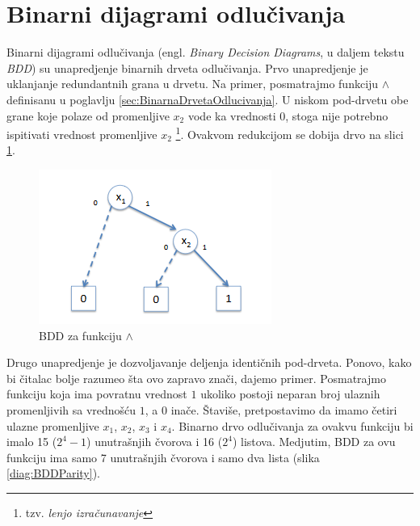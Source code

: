 \section{Binarni dijagrami odlu\v{c}ivanja}
\label{sec:BDD}

Binarni dijagrami odlu\v{c}ivanja (engl. \emph{Binary Decision Diagrams}, u daljem tekstu \emph{BDD}) su unapredjenje binarnih drveta odlu\v{c}ivanja. Prvo unapredjenje je uklanjanje redundantnih grana u drvetu. Na primer, posmatrajmo funkciju $\wedge$ definisanu u poglavlju \ref{sec:BinarnaDrvetaOdlucivanja}. U niskom pod-drvetu obe grane koje polaze od promenljive $x_{2}$ vode ka vrednosti $0$, stoga nije potrebno ispitivati vrednost promenljive $x_{2}$ \footnote{tzv. \emph{lenjo izra\v{c}unavanje}}. Ovakvom redukcijom se dobija drvo na slici \ref{diag:BDDAnd}.

\begin{figure}[H]
    \centering
    \includegraphics[scale=0.8]{slike/BDD_And.PNG}
    \caption{BDD za funkciju $\wedge$}
    \label{diag:BDDAnd}
\end{figure}

Drugo unapredjenje je dozvoljavanje deljenja identi\v{c}nih pod-drveta. Ponovo, kako bi \v{c}italac bolje razumeo \v{s}ta ovo zapravo zna\v{c}i, dajemo primer. Posmatrajmo funkciju koja ima povratnu vrednost $1$ ukoliko postoji neparan broj ulaznih promenljivih sa vredno\v{s}\'c{}u $1$, a $0$ ina\v{c}e. \v{S}tavi\v{s}e, pretpostavimo da imamo \v{c}etiri ulazne promenljive $x_{1}$, $x_{2}$, $x_{3}$ i $x_{4}$. Binarno drvo odlu\v{c}ivanja za ovakvu funkciju bi imalo 15 ($2^4 - 1$) unutra\v{s}njih \v{c}vorova i 16 ($2^4$) listova. Medjutim, BDD za ovu funkciju ima samo 7 unutra\v{s}njih \v{c}vorova i samo dva lista (slika \ref{diag:BDDParity}).

